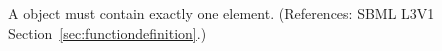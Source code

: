 A \FunctionDefinition object must contain exactly one 
element.  (References: SBML L3V1 Section~\ref{sec:functiondefinition}.)
